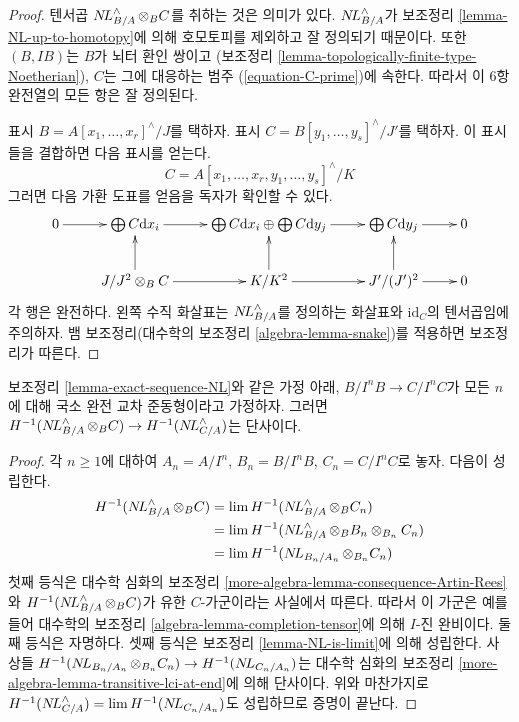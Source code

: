 \begin{proof}
텐서곱 $\mathop{N\!L}\nolimits_{B/A}^\wedge \otimes_B C$를 취하는 것은 의미가 있다.
$\mathop{N\!L}\nolimits_{B/A}^\wedge$가 보조정리 \ref{lemma-NL-up-to-homotopy}에 의해
호모토피를 제외하고 잘 정의되기 때문이다.
또한 $(B, IB)$는 $B$가 뇌터 환인 쌍이고
(보조정리 \ref{lemma-topologically-finite-type-Noetherian}),
$C$는 그에 대응하는 범주 (\ref{equation-C-prime})에 속한다.
따라서 이 $6$항 완전열의 모든 항은 잘 정의된다.

\medskip\noindent
표시 $B = A[x_1, \ldots, x_r]^\wedge/J$를 택하자.
표시 $C = B[y_1, \ldots, y_s]^\wedge/J'$를 택하자.
이 표시들을 결합하면 다음 표시를 얻는다.
$$
C = A[x_1, \ldots, x_r, y_1, \ldots, y_s]^\wedge/K
$$
그러면 다음 가환 도표를 얻음을 독자가 확인할 수 있다.
$$
\xymatrix{
0 \ar[r] &
\bigoplus C \text{d}x_i \ar[r] &
\bigoplus C \text{d}x_i \oplus \bigoplus C \text{d}y_j \ar[r] &
\bigoplus C \text{d}y_j \ar[r] &
0 \\
&
J/J^2 \otimes_B C \ar[r] \ar[u] &
K/K^2 \ar[r] \ar[u] &
J'/(J')^2 \ar[r] \ar[u] &
0
}
$$
각 행은 완전하다. 왼쪽 수직 화살표는 $\mathop{N\!L}\nolimits_{B/A}^\wedge$를 정의하는 화살표와
$\text{id}_C$의 텐서곱임에 주의하자.
뱀 보조정리(대수학의 보조정리 \ref{algebra-lemma-snake})를 적용하면 보조정리가 따른다.
\end{proof}

\begin{lemma}
\label{lemma-transitive-lci-at-end}
보조정리 \ref{lemma-exact-sequence-NL}와 같은 가정 아래,
$B/I^nB \to C/I^nC$가 모든 $n$에 대해 국소 완전 교차 준동형이라고 가정하자.
그러면
$H^{-1}(\mathop{N\!L}\nolimits_{B/A}^\wedge \otimes_B C) \to H^{-1}(\mathop{N\!L}\nolimits_{C/A}^\wedge)$는 단사이다.
\end{lemma}

\begin{proof}
각 $n \geq 1$에 대하여 $A_n = A/I^n$, $B_n = B/I^nB$,
$C_n = C/I^nC$로 놓자. 다음이 성립한다.
\begin{align*}
H^{-1}(\mathop{N\!L}\nolimits_{B/A}^\wedge \otimes_B C)
& =
\mathop{\mathrm{lim}}\nolimits H^{-1}(\mathop{N\!L}\nolimits_{B/A}^\wedge \otimes_B C_n) \\
& =
\mathop{\mathrm{lim}}\nolimits H^{-1}(\mathop{N\!L}\nolimits_{B/A}^\wedge \otimes_B B_n \otimes_{B_n} C_n) \\
& =
\mathop{\mathrm{lim}}\nolimits H^{-1}(\mathop{N\!L}\nolimits_{B_n/A_n} \otimes_{B_n} C_n)
\end{align*}
첫째 등식은 대수학 심화의 보조정리
\ref{more-algebra-lemma-consequence-Artin-Rees}와
$H^{-1}(\mathop{N\!L}\nolimits_{B/A}^\wedge \otimes_B C)$가 유한 $C$-가군이라는 사실에서 따른다.
따라서 이 가군은 예를 들어 대수학의 보조정리
\ref{algebra-lemma-completion-tensor}에 의해 $I$-진 완비이다.
둘째 등식은 자명하다. 셋째 등식은 보조정리 \ref{lemma-NL-is-limit}에 의해 성립한다.
사상들 $H^{-1}(\mathop{N\!L}\nolimits_{B_n/A_n} \otimes_{B_n} C_n) \to
H^{-1}(\mathop{N\!L}\nolimits_{C_n/A_n})$는 대수학 심화의 보조정리
\ref{more-algebra-lemma-transitive-lci-at-end}에 의해 단사이다.
위와 마찬가지로
$H^{-1}(\mathop{N\!L}\nolimits_{C/A}^\wedge) = \mathop{\mathrm{lim}}\nolimits H^{-1}(\mathop{N\!L}\nolimits_{C_n/A_n})$도 성립하므로 증명이 끝난다.
\end{proof}


